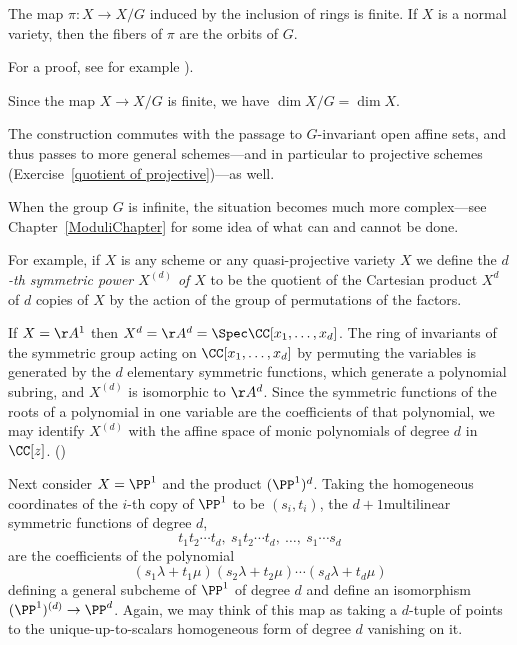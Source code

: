 \begin{theorem}\label{finite invariant theory}
 The map $\pi: X\to X/G$ induced by the inclusion of rings is finite. If $X$ is a normal variety, then the fibers of $\pi$  are the orbits of $G$.
\end{theorem}
For a proof, see for example \cite[Proposition 13.10]{Eisenbud1995}).  

Since the map $X\to X/G$ is finite, we have $\dim X/G = \dim X$. 

The construction commutes with the passage to $G$-invariant open affine sets, and thus passes to more general schemes---and in particular to projective schemes (Exercise~\ref{quotient of projective})---as well.

When the group $G$ is infinite, the situation becomes much more complex---see Chapter~\ref{ModuliChapter} for some  idea of what can and cannot be done.

For example, if $X$ is any scheme or any quasi-projective variety $X$ we define the \emph{$d$-th symmetric power $X^{(d)}$ of $X$} to be the quotient of the Cartesian product $X^d$ of $d$ copies of $X$ by the action of the group of permutations of the factors. 


If $X=\AA^{1}$ then $X^{d} = \AA^{d} = \Spec \CC[x_{1}, \dots, x_{d}]$. The ring of invariants of the symmetric group acting on
$\CC[x_{1}, \dots, x_{d}]$ by permuting the variables is generated by the $d$ elementary symmetric functions, which generate a polynomial subring, and $X^{(d)}$ is isomorphic to $\AA^{d}$. Since the symmetric functions of the roots of a polynomial in one variable are the coefficients of
that polynomial, we may identify $X^{(d)}$ with the affine space of monic polynomials of degree $d$ in $\CC[z]$. (\cite[Exercises 1.6, 13.2-13.4]{Eisenbud1995})

Next consider $X = \PP^1$ and the product $(\PP^1)^d$. Taking the homogeneous coordinates of the
$i$-th copy of $\PP^1$ to be $(s_i,t_i)$, the $d+1 $multilinear symmetric functions of degree $d$,
$$
t_1t_2\cdots t_d,\ s_1t_2\cdots t_d,\ \dots,\ s_1\cdots s_d
$$
are the coefficients of the polynomial
$$
(s_1\lambda + t_1\mu)(s_2\lambda + t_2\mu)\cdots(s_d\lambda + t_d\mu)
$$
defining a general subcheme of $\PP^1$ of degree $d$ and  define
an isomorphism $(\PP^1)^{(d)} \to \PP^d$.
Again, we may think of this map as taking a $d$-tuple of points to the unique-up-to-scalars
homogeneous form of degree $d$ vanishing on it.


